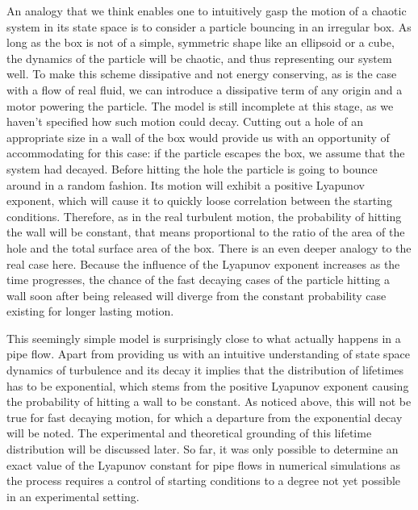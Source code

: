 \documentclass[11pt,a4paper]{article}
\begin{document}
An analogy that we think enables one to intuitively gasp the motion of a chaotic system in its state space is to consider a particle bouncing in an irregular box\cite{Ott93}.
As long as the box is not of a simple, symmetric shape like an ellipsoid or a cube, the dynamics of the particle will be chaotic, and thus representing our system well\cite{Ott93}.
To make this scheme dissipative and not energy conserving, as is the case with a flow of real fluid, we can introduce a dissipative term of any origin and a motor powering the particle.
The model is still incomplete at this stage, as we haven't specified how such motion could decay.
Cutting out a hole of an appropriate size in a wall of the box would provide us with an opportunity of accommodating for this case: if the particle escapes the box, we assume that the system had decayed.
Before hitting the hole the particle is going to bounce around in a random fashion.
Its motion will exhibit a positive Lyapunov exponent, which will cause it to quickly loose correlation between the starting conditions.
Therefore, as in the real turbulent motion, the probability of hitting the wall will be constant, that means proportional to the ratio of the area of the hole and the total surface area of the box.
There is an even deeper analogy to the real case here.
Because the influence of the Lyapunov exponent increases as the time progresses, the chance of the fast decaying cases of the particle hitting a wall soon after being released will diverge from the constant probability case existing for longer lasting motion.

This seemingly simple model is surprisingly close to what actually happens in a pipe flow.
Apart from providing us with an intuitive understanding of state space dynamics of turbulence and its decay it implies that the distribution of lifetimes has to be exponential, which stems from the positive Lyapunov exponent causing the probability of hitting a wall to be constant.
As noticed above, this will not be true for fast decaying motion, for which a departure from the exponential decay will be noted.
The experimental and theoretical grounding of this lifetime distribution will be discussed later.
So far, it was only possible to determine an exact value of the Lyapunov constant for pipe flows in numerical simulations\cite{Faisst04} as the process requires a control of starting conditions to a degree not yet possible in an experimental setting.
\end{document}
